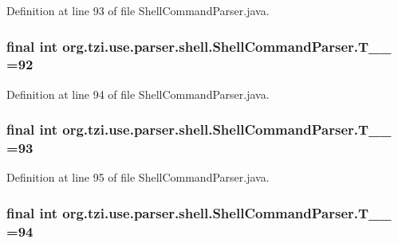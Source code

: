 Definition at line 93 of file Shell\-Command\-Parser.\-java.

\hypertarget{classorg_1_1tzi_1_1use_1_1parser_1_1shell_1_1_shell_command_parser_a0d59292b8520ef71db4d6c444e0cc74d}{
\subsubsection[{T\-\_\-\-\_\-92}]{\setlength{\rightskip}{0pt plus 5cm}final int org.\-tzi.\-use.\-parser.\-shell.\-Shell\-Command\-Parser.\-T\-\_\-\-\_ =92\hspace{0.3cm}{\ttfamily [static]}}}\label{classorg_1_1tzi_1_1use_1_1parser_1_1shell_1_1_shell_command_parser_a0d59292b8520ef71db4d6c444e0cc74d}


Definition at line 94 of file Shell\-Command\-Parser.\-java.

\hypertarget{classorg_1_1tzi_1_1use_1_1parser_1_1shell_1_1_shell_command_parser_a7100a1f2a4dcaef82d170249adfc778c}{
\subsubsection[{T\-\_\-\-\_\-93}]{\setlength{\rightskip}{0pt plus 5cm}final int org.\-tzi.\-use.\-parser.\-shell.\-Shell\-Command\-Parser.\-T\-\_\-\-\_ =93\hspace{0.3cm}{\ttfamily [static]}}}\label{classorg_1_1tzi_1_1use_1_1parser_1_1shell_1_1_shell_command_parser_a7100a1f2a4dcaef82d170249adfc778c}


Definition at line 95 of file Shell\-Command\-Parser.\-java.

\hypertarget{classorg_1_1tzi_1_1use_1_1parser_1_1shell_1_1_shell_command_parser_aad75c8cb4ad9e129356e868084b1fd4f}{
\subsubsection[{T\-\_\-\-\_\-94}]{\setlength{\rightskip}{0pt plus 5cm}final int org.\-tzi.\-use.\-parser.\-shell.\-Shell\-Command\-Parser.\-T\-\_\-\-\_ =94\hspace{0.3cm}{\ttfamily [static]}}}\label{classorg_1_1tzi_1_1use_1_1parser_1_1shell_1_1_shell_command_parser_aad75c8cb4ad9e129356e868084b1fd4f}


